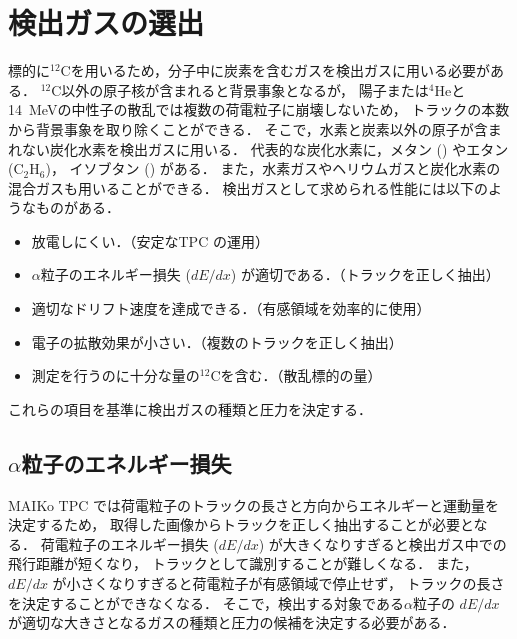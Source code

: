 \documentclass[../master]{subfiles}
\begin{document}
\section{検出ガスの選出}
\label{sec::detection_gas_candidate}
標的に${}^{12}\mathrm{C}$を用いるため，分子中に炭素を含むガスを検出ガスに用いる必要がある．
${}^{12}\mathrm{C}$以外の原子核が含まれると背景事象となるが，
陽子または${}^{4}\mathrm{He}$と\SI{14}{\mega\electronvolt}の中性子の散乱では複数の荷電粒子に崩壊しないため，
トラックの本数から背景事象を取り除くことができる．
そこで，水素と炭素以外の原子が含まれない炭化水素を検出ガスに用いる．
代表的な炭化水素に，メタン (\Methane) やエタン ($\mathrm{C_{2}H_{6}}$)，
イソブタン (\isoButane) がある．
また，水素ガスやヘリウムガスと炭化水素の混合ガスも用いることができる．
検出ガスとして求められる性能には以下のようなものがある．
\begin{itemize}
\item
  放電しにくい．（安定なTPC の運用）
\item
  $\alpha$粒子のエネルギー損失 ($dE/dx$) が適切である．（トラックを正しく抽出）
\item
  適切なドリフト速度を達成できる．（有感領域を効率的に使用）
\item
  電子の拡散効果が小さい．（複数のトラックを正しく抽出）
\item
  測定を行うのに十分な量の${}^{12}\mathrm{C}$を含む．（散乱標的の量）
\end{itemize}
これらの項目を基準に検出ガスの種類と圧力を決定する．

\subsection{$\alpha$粒子のエネルギー損失}
MAIKo TPC では荷電粒子のトラックの長さと方向からエネルギーと運動量を決定するため，
取得した画像からトラックを正しく抽出することが必要となる．
荷電粒子のエネルギー損失 ($dE/dx$) が大きくなりすぎると検出ガス中での飛行距離が短くなり，
トラックとして識別することが難しくなる．
また，$dE/dx$ が小さくなりすぎると荷電粒子が有感領域で停止せず，
トラックの長さを決定することができなくなる．
そこで，検出する対象である$\alpha$粒子の $dE/dx$ が適切な大きさとなるガスの種類と圧力の候補を決定する必要がある．
\end{document}
